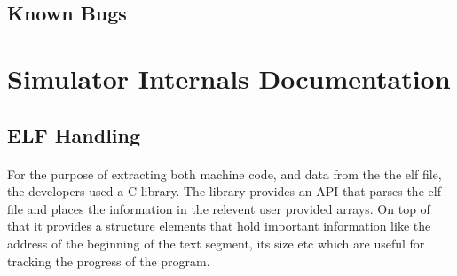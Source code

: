 \documentclass[letterpaper, 11pt, twoside]{article}
\begin{document}
\subsection{Known Bugs}
\paragraph{}

\cleardoublepage

\section[Internals]{Simulator Internals Documentation}
\paragraph{}
\begin{flushleft}

\end{flushleft}



\subsection{ELF Handling}
\paragraph{} 
\begin{flushleft}
For the purpose of extracting both machine code, and data from the the elf file, the developers used a C library. The library provides an API that parses the elf file and places the information in the relevent user provided arrays. On top of that it provides a structure elements that hold important information like the address of the beginning of the text segment, its size etc which are useful for tracking the progress of the program.
\end{flushleft}
\end{document}
